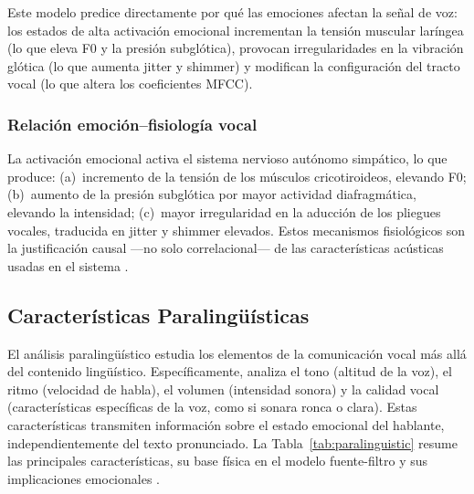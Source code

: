 Este modelo predice directamente por qué las emociones afectan la señal de voz: los
estados de alta activación emocional incrementan la tensión muscular laríngea (lo
que eleva F0 y la presión subglótica), provocan irregularidades en la vibración
glótica (lo que aumenta jitter y shimmer) y modifican la configuración del tracto
vocal (lo que altera los coeficientes MFCC).

\subsubsection{Relación emoción--fisiología vocal}

La activación emocional activa el sistema nervioso autónomo simpático, lo que produce:
(a)~incremento de la tensión de los músculos cricotiroideos, elevando F0;
(b)~aumento de la presión subglótica por mayor actividad diafragmática, elevando la
intensidad; (c)~mayor irregularidad en la aducción de los pliegues vocales, traducida
en jitter y shimmer elevados. Estos mecanismos fisiológicos son la justificación
causal ---no solo correlacional--- de las características acústicas usadas en el sistema
\cite{jha2022, lian2023}.

\subsection{Características Paralingüísticas}
\label{sec:rt_paralinguistico}

El análisis paralingüístico estudia los elementos de la comunicación vocal más allá
del contenido lingüístico. Específicamente, analiza el tono (altitud de la voz), el
ritmo (velocidad de habla), el volumen (intensidad sonora) y la calidad vocal
(características específicas de la voz, como si sonara ronca o clara). Estas
características transmiten información sobre el estado emocional del hablante,
independientemente del texto pronunciado. La Tabla~\ref{tab:paralinguistic} resume las
principales características, su base física en el modelo fuente-filtro y sus
implicaciones emocionales \cite{jha2022, lian2023}.

